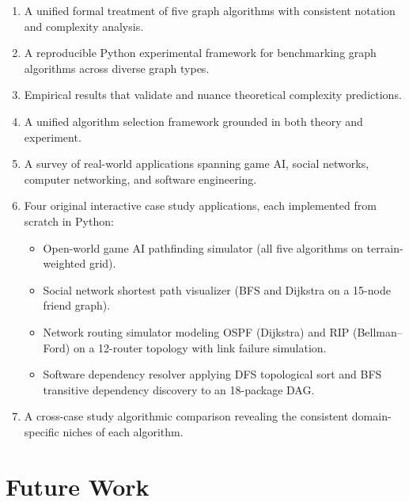 \documentclass[12pt, a4paper, oneside]{report}
\theoremstyle{definition}
\begin{document}
\begin{enumerate}
    \item A unified formal treatment of five graph algorithms with consistent notation and complexity analysis.
    \item A reproducible Python experimental framework for benchmarking graph algorithms across diverse graph types.
    \item Empirical results that validate and nuance theoretical complexity predictions.
    \item A unified algorithm selection framework grounded in both theory and experiment.
    \item A survey of real-world applications spanning game AI, social networks, computer networking, and software engineering.
    \item Four original interactive case study applications, each implemented from scratch in Python:
    \begin{itemize}
        \item Open-world game AI pathfinding simulator (all five algorithms on terrain-weighted grid).
        \item Social network shortest path visualizer (BFS and Dijkstra on a 15-node friend graph).
        \item Network routing simulator modeling OSPF (Dijkstra) and RIP (Bellman–Ford) on a 12-router topology with link failure simulation.
        \item Software dependency resolver applying DFS topological sort and BFS transitive dependency discovery to an 18-package DAG.
    \end{itemize}
    \item A cross-case study algorithmic comparison revealing the consistent domain-specific niches of each algorithm.
\end{enumerate}

\section{Future Work}
\end{document}
